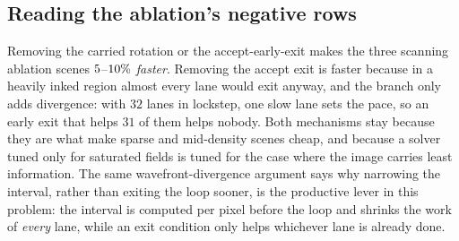 \subsection{Reading the ablation's negative rows}

Removing the carried rotation or the accept-early-exit makes the three scanning
ablation scenes $5$--$10\%$ \emph{faster}. Removing the accept exit is faster because in a
heavily inked region almost every lane would exit anyway, and the branch only
adds divergence: with $32$ lanes in lockstep, one slow lane sets the pace, so an
early exit that helps $31$ of them helps nobody. Both mechanisms stay because
they are what make sparse and mid-density scenes cheap, and because a solver
tuned only for saturated fields is tuned for the case where the image carries
least information. The same wavefront-divergence argument says why narrowing the
interval, rather than exiting the loop sooner, is the productive lever in this
problem: the interval is computed per pixel before the loop and shrinks the work
of \emph{every} lane, while an exit condition only helps whichever lane is
already done.
